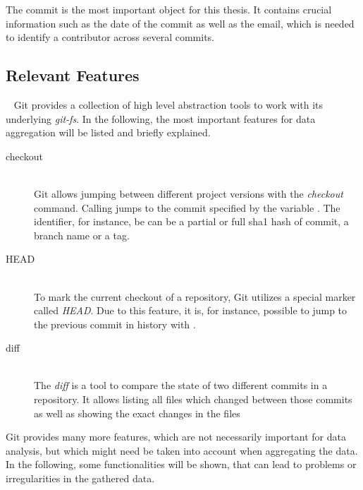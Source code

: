 The commit is the most important object for this thesis.
It contains crucial information such as the date of the commit as well as the email, which is needed to identify a contributor across several commits.

\subsection{Relevant Features}~\label{git-features}
Git provides a collection of high level abstraction tools to work with its underlying \emph{git-fs}.
In the following, the most important features for data aggregation will be listed and briefly explained.

\begin{description}
    \item[checkout] \hfill \\
        Git allows jumping between different project versions with the \emph{checkout} command.
        Calling  jumps to the commit specified by the variable .
        The identifier, for instance, be can be a partial or full \ac{sha1} hash of commit, a branch name or a tag.

    \item[HEAD] \hfill \\
        To mark the current checkout of a repository, Git utilizes a special marker called \emph{HEAD}.
        Due to this feature, it is, for instance, possible to jump to the previous commit in history with .

    \item[diff] \hfill \\
        The \emph{diff} is a tool to compare the state of two different commits in a repository.
        It allows listing all files which changed between those commits as well as showing the exact changes in the files

\end{description}

Git provides many more features, which are not necessarily important for data analysis, but which might need be taken into account when aggregating the data.
In the following, some functionalities will be shown, that can lead to problems or irregularities in the gathered data.

